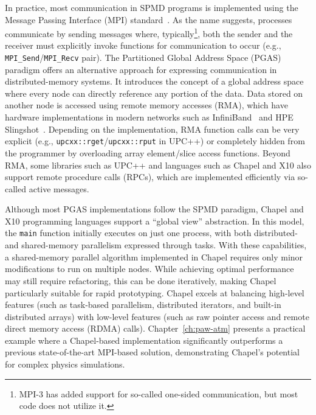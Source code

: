 In practice, most communication in SPMD programs is implemented using the Message Passing Interface (MPI) standard~\cite{mpi41}. As the name suggests, processes communicate by sending messages where, typically\footnote{MPI-3 has added support for so-called one-sided communication, but most code does not utilize it.}, both the sender and the receiver must explicitly invoke functions for communication to occur (e.g., \verb|MPI_Send|/\verb|MPI_Recv| pair). The Partitioned Global Address Space (PGAS) paradigm offers an alternative approach for expressing communication in distributed-memory systems. It introduces the concept of a global address space where every node can directly reference any portion of the data. Data stored on another node is accessed using remote memory accesses (RMA), which have hardware implementations in modern networks such as InfiniBand~ and HPE Slingshot~\cite{De_Sen_2020_An_In_Depth_Ana}. Depending on the implementation, RMA function calls can be very explicit (e.g., \verb|upcxx::rget|/\verb|upcxx::rput| in UPC++) or completely hidden from the programmer by overloading array element/slice access functions. Beyond RMA, some libraries such as UPC++ and languages such as Chapel and X10 also support remote procedure calls (RPCs), which are implemented efficiently via so-called active messages.

Although most PGAS implementations follow the SPMD paradigm, Chapel and X10 programming languages support a ``global view'' abstraction. In this model, the \verb|main| function initially executes on just one process, with both distributed- and shared-memory parallelism expressed through tasks. With these capabilities, a shared-memory parallel algorithm implemented in Chapel requires only minor modifications to run on multiple nodes. While achieving optimal performance may still require refactoring, this can be done iteratively, making Chapel particularly suitable for rapid prototyping. Chapel excels at balancing high-level features (such as task-based parallelism, distributed iterators, and built-in distributed arrays) with low-level features (such as raw pointer access and remote direct memory access (RDMA) calls). Chapter~\ref{ch:paw-atm} presents a practical example where a Chapel-based implementation significantly outperforms a previous state-of-the-art MPI-based solution, demonstrating Chapel's potential for complex physics simulations.

